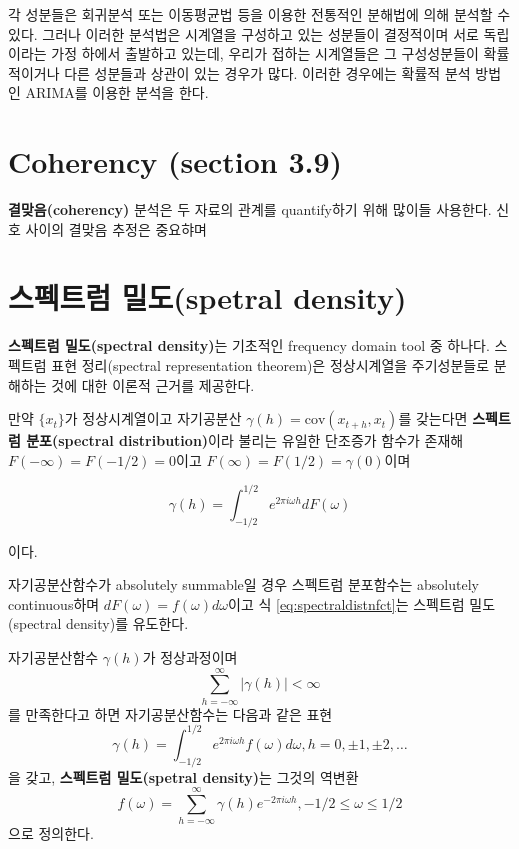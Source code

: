 \documentclass[b5paper,]{scrbook}
\theoremstyle{plain}
\theoremstyle{definition}
\numberwithin{equation}{section}
\let\BeginKnitrBlock\begin \let\EndKnitrBlock\end
\begin{document}
각 성분들은 회귀분석 또는 이동평균법 등을 이용한 전통적인 분해법에 의해
분석할 수 있다. 그러나 이러한 분석법은 시계열을 구성하고 있는 성분들이
결정적이며 서로 독립이라는 가정 하에서 출발하고 있는데, 우리가 접하는
시계열들은 그 구성성분들이 확률적이거나 다른 성분들과 상관이 있는 경우가
많다. 이러한 경우에는 확률적 분석 방법인 ARIMA를 이용한 분석을 한다.

\section{Coherency (section 3.9)}\label{coherency-section-3.9}

\textbf{결맞음(coherency)} 분석은 두 자료의 관계를 quantify하기 위해
많이들 사용한다. 신호 사이의 결맞음 추정은 중요햐며

\section{스펙트럼 밀도(spetral density)}\label{-spetral-density}

\textbf{스펙트럼 밀도(spectral density)}는 기초적인 frequency domain
tool 중 하나다. 스펙트럼 표현 정리(spectral representation theorem)은
정상시계열을 주기성분들로 분해하는 것에 대한 이론적 근거를 제공한다.

\BeginKnitrBlock{definition}[자기공분산함수의 스펙트럼 표현]
\protect\hypertarget{def:unnamed-chunk-142}{}{\label{def:unnamed-chunk-142}
{} }만약 \(\{x_{t} \}\)가
정상시계열이고 자기공분산 \(\gamma(h)=\text{cov}(x_{t+h},x_{t})\)를
갖는다면 \textbf{스펙트럼 분포(spectral distribution)}이라 불리는 유일한
단조증가 함수가 존재해 \(F(-\infty)=F(-1/2)=0\)이고
\(F(\infty)=F(1/2)=\gamma(0)\)이며

\begin{equation}
\gamma(h)=\int_{-1/2}^{1/2}e^{2\pi i \omega h}dF(\omega)
\label{eq:spectraldistnfct}
\end{equation}

이다.
\EndKnitrBlock{definition}

자기공분산함수가 absolutely summable일 경우 스펙트럼 분포함수는
absolutely continuous하며 \(dF(\omega)=f(\omega)d\omega\)이고 식
\eqref{eq:spectraldistnfct}는 스펙트럼 밀도(spectral density)를 유도한다.

\BeginKnitrBlock{definition}[스펙트럼 밀도]
\protect\hypertarget{def:unnamed-chunk-143}{}{\label{def:unnamed-chunk-143}
{} }자기공분산함수 \(\gamma(h)\)가
정상과정이며 \[\sum_{h=-\infty}^{\infty}|\gamma(h)|<\infty\] 를
만족한다고 하면 자기공분산함수는 다음과 같은 표현
\[\gamma(h)=\int_{-1/2}^{1/2}e^{2\pi i \omega h}f(\omega)d\omega, h=0,\pm 1,\pm 2,\ldots\]
을 갖고, \textbf{스펙트럼 밀도(spetral density)}는 그것의 역변환
\[f(\omega)=\sum_{h=-\infty}^{\infty}\gamma(h)e^{-2\pi i \omega h}, -1/2 \leq \omega \leq 1/2\]
으로 정의한다.
\EndKnitrBlock{definition}
\end{document}
